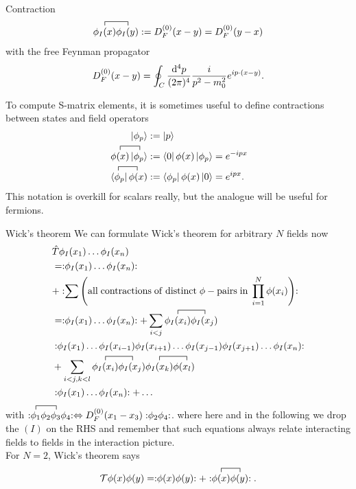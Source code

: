 \begin{mybox}{Contraction}
	\begin{equation}
		\contraction{}{\phi_I(x)}{}{\phi_I(y)} \phi_I(x) \phi_I(y) := D^{(0)}_F (x-y) = D^{(0)}_F(y-x)
	\end{equation}
	with the free Feynman propagator
	\begin{equation}
		D^{(0)}_F(x-y) =\oint_C \frac{\mathrm{d}^4p}{(2 \pi)^4} \frac{i}{p^2-m^2_0} e^{i p\cdot (x-y)}.
	\end{equation}
\end{mybox}
To compute S-matrix elements, it is sometimes useful to define contractions between states and
field operators
\begin{align}
 	\ket{\phi_p}&:=\ket{p}\\
 	\contraction{}{\phi(x)}{}{\ket{\phi_o}} \phi(x) \ket{\phi_p}&:=\bra{0}\phi(x) \ket{\phi_p}=e^{-ipx}\\
 	{	\contraction{}{\bra{\phi_p}}{}{\phi(x)}\bra{\phi_p}\phi(x)}&:=\bra{\phi_p}\phi(x)\ket{0}=e^{ipx}.
\end{align}
This notation is overkill for scalars really, but the analogue will be useful for fermions.
\begin{mybox}{Wick's theorem}
	We can formulate Wick's theorem for arbitrary $N$ fields now
	\begin{align*}
		&\hat{T}\phi_I(x_1) \dots \phi_I(x_n) \\
		&= \normord{\phi_I(x_1) \dots \phi_I(x_n)} \\
		&+ \normord{\sum \left(\mathrm{all \;contractions\; of \;distinct}\;\phi-\mathrm{pairs \; in} \; \prod_{i=1}^{N}\phi(x_i)\right)} \\
				&= \normord{\phi_I(x_1) \dots \phi_I(x_n)} + \sum_{i<j} \contraction{}{\phi_I(x_i)}{}{\phi_I(x_j)} \phi_I(x_i) \phi_I(x_j) \\
				&\normord{\phi_I(x_1) \dots \phi_I(x_{i-1})\phi_I(x_{i+1}) \dots  \phi_I(x_{j-1}) \phi_I(x_{j+1}) \dots \phi_I(x_n)} \\
				&+ \sum_{i<j, k<l} \contraction{}{\phi_I(x_i)}{}{\phi_I(x_j)} \phi_I(x_i) \phi_I(x_j) \contraction{}{\phi_I(x_k)}{}{\phi_I(x_l)} \phi_I(x_k) \phi(x_l) \\
				&\normord{\phi_I(x_1) \dots \phi_I(x_n)}+ \dots 
	\end{align*}
with $\normord{\contraction{}{\phi_1}{\phi_2}{\phi_3} \phi_1 \phi_2 \phi_3 \phi_4} \Leftrightarrow D^{(0)}_F(x_1-x_3) \normord{\phi_2 \phi_4}$. where here and in the following we drop the $(I)$ on the RHS and remember that such equations
always relate interacting fields to fields in the interaction picture.
\\
For $N=2$, Wick's theorem says
\begin{equation}
\mathcal{T} \phi(x) \phi(y) = \normord{\phi(x) \phi(y)} + \normord{\contraction{}{\phi(x)}{}{\phi(y)}{} \phi(x) \phi(y)}.
\end{equation}
\end{mybox}
